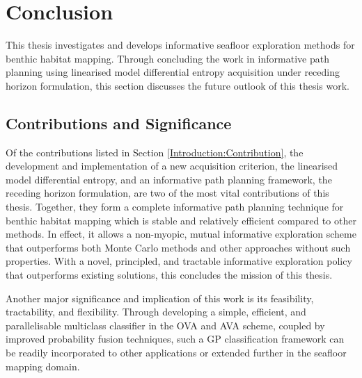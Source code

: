 \chapter{Conclusion}
\label{Conclusion}

	This thesis investigates and develops informative seafloor exploration methods for benthic habitat mapping. Through concluding the work in informative path planning using linearised model differential entropy acquisition under receding horizon formulation, this section discusses the future outlook of this thesis work.
	
	\section{Contributions and Significance}
		
		Of the contributions listed in Section \ref{Introduction:Contribution}, the development and implementation of a new acquisition criterion, the linearised model differential entropy, and an informative path planning framework, the receding horizon formulation, are two of the most vital contributions of this thesis. Together, they form a complete informative path planning technique for benthic habitat mapping which is stable and relatively efficient compared to other methods. In effect, it allows a non-myopic, mutual informative exploration scheme that outperforms both Monte Carlo methods and other approaches without such properties. With a novel, principled, and tractable informative exploration policy that outperforms existing solutions, this concludes the mission of this thesis.
		
		Another major significance and implication of this work is its feasibility, tractability, and flexibility. Through developing a simple, efficient, and parallelisable multiclass classifier in the OVA and AVA scheme, coupled by improved probability fusion techniques, such a GP classification framework can be readily incorporated to other applications or extended further in the seafloor mapping domain.
		
		
